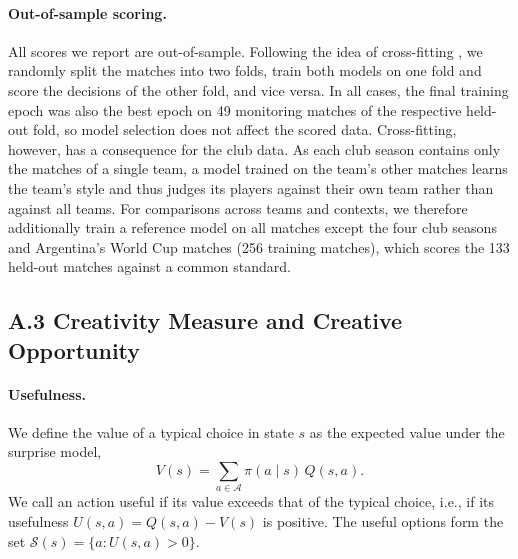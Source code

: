 \paragraph{Out-of-sample scoring.} All scores we report are out-of-sample. Following the idea of cross-fitting
\parencite{chernozhukov2018double}, we randomly split the matches into two folds, train both models on one fold and
score the decisions of the other fold, and vice versa. In all cases, the final training epoch was also the best epoch
on 49 monitoring matches of the respective held-out fold, so model selection does not affect the scored data.
Cross-fitting, however, has a consequence for the club data. As each club season contains only the matches of a
single team, a model trained on the team's other matches learns the team's style and thus judges its players against
their own team rather than against all teams. For comparisons across teams and contexts, we therefore additionally
train a reference model on all matches except the four club seasons and Argentina's World Cup matches (256 training
matches), which scores the 133 held-out matches against a common standard.

\subsection*{A.3 Creativity Measure and Creative Opportunity}

\paragraph{Usefulness.} We define the value of a typical choice in state $s$ as the expected value under the surprise
model,
\begin{equation*}
V(s) = \sum_{a \in \mathcal{A}} \pi(a \mid s)\, Q(s,a).
\end{equation*}
We call an action useful if its value exceeds that of the typical choice, i.e., if its usefulness
$U(s,a) = Q(s,a) - V(s)$ is positive. The useful options form the set $\mathcal{S}(s) = \{a : U(s,a) > 0\}$.

